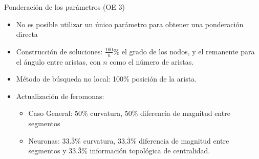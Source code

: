 \begin{frame}{Ponderaci\'on de los par\'ametros (OE 3)}
    \begin{itemize}
    \item No es posible utilizar un \'unico par\'ametro para obtener una ponderaci\'on directa
    \item Construcci\'on de soluciones: $\frac{100}{n}$\% el grado de los nodos, y el remanente para el \'angulo entre aristas, con $n$ como el n\'umero de aristas.
    \item M\'etodo de b\'usqueda no local: 100\% posici\'on de la arista.
    \item Actualizaci\'on de feromonas: 
    \begin{itemize}
        \item Caso General: 50\% curvatura, 50\% diferencia de magnitud entre segmentos
        \item Neuronas: $33.\overline{3}\%$ curvatura, $33.\overline{3}\%$ diferencia de magnitud entre segmentos y $33.\overline{3}\%$ informaci\'on topol\'ogica de centralidad.
    \end{itemize}
\end{itemize}
\end{frame}


    
